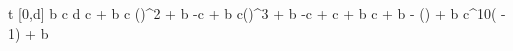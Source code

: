 t
[0,d]
b
c
d
c \cdot {} + b
c \cdot ()^2 + b
-c\cdot {}\cdot {} + b
c\cdot()^3 + b
-c\cdot {} + c + b
c \cdot {} + b
- \cdot () + b
c^{10}( - 1) + b